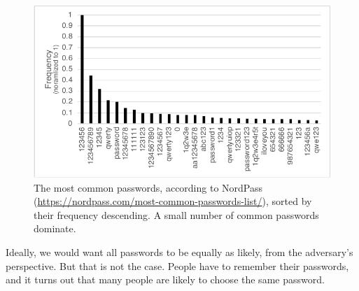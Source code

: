 \begin{figure}
  \includegraphics[width=\textwidth]{figs/password-dist.pdf}
  \caption{The most common passwords, according to
  NordPass (\url{https://nordpass.com/most-common-passwords-list/}),
  sorted by their frequency descending.
  A small number of common passwords dominate.
  }
\end{figure}

Ideally, we would want all passwords to be equally as likely,
from the adversary's perspective.
But that is not the case.
People have to remember their passwords,
and it turns out that many people are likely to choose the same password.


